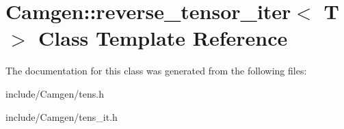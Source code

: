 \hypertarget{a00480}{}\section{Camgen\+:\+:reverse\+\_\+tensor\+\_\+iter$<$ T $>$ Class Template Reference}
\label{a00480}


The documentation for this class was generated from the following files\+:\begin{DoxyCompactItemize}
\item 
include/\+Camgen/tens.\+h\item 
include/\+Camgen/tens\+\_\+it.\+h\end{DoxyCompactItemize}
